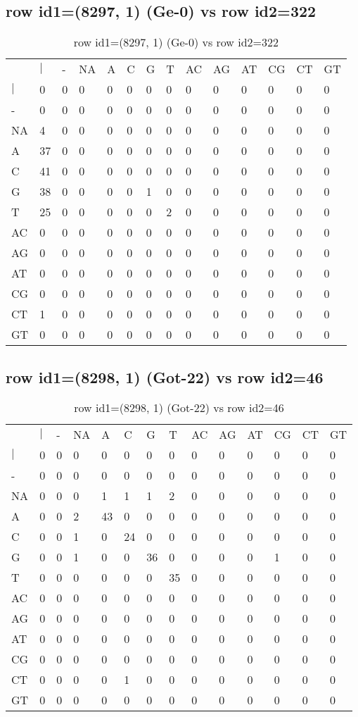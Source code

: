 \subsection{row id1=(8297, 1) (Ge-0) vs row id2=322}
\begin{center}
\begin{longtable}{|l|l|l|l|l|l|l|l|l|l|l|l|l|l|}
\caption{row id1=(8297, 1) (Ge-0) vs row id2=322} \label{table_dm468}\\
\hline
\\
\hline
&$|$&-&NA&A&C&G&T&AC&AG&AT&CG&CT&GT\\
$|$&0&0&0&0&0&0&0&0&0&0&0&0&0\\
-&0&0&0&0&0&0&0&0&0&0&0&0&0\\
NA&4&0&0&0&0&0&0&0&0&0&0&0&0\\
A&37&0&0&0&0&0&0&0&0&0&0&0&0\\
C&41&0&0&0&0&0&0&0&0&0&0&0&0\\
G&38&0&0&0&0&1&0&0&0&0&0&0&0\\
T&25&0&0&0&0&0&2&0&0&0&0&0&0\\
AC&0&0&0&0&0&0&0&0&0&0&0&0&0\\
AG&0&0&0&0&0&0&0&0&0&0&0&0&0\\
AT&0&0&0&0&0&0&0&0&0&0&0&0&0\\
CG&0&0&0&0&0&0&0&0&0&0&0&0&0\\
CT&1&0&0&0&0&0&0&0&0&0&0&0&0\\
GT&0&0&0&0&0&0&0&0&0&0&0&0&0\\
\hline
\end{longtable}
\end{center}

\subsection{row id1=(8298, 1) (Got-22) vs row id2=46}
\begin{center}
\begin{longtable}{|l|l|l|l|l|l|l|l|l|l|l|l|l|l|}
\caption{row id1=(8298, 1) (Got-22) vs row id2=46} \label{table_dm470}\\
\hline
\\
\hline
&$|$&-&NA&A&C&G&T&AC&AG&AT&CG&CT&GT\\
$|$&0&0&0&0&0&0&0&0&0&0&0&0&0\\
-&0&0&0&0&0&0&0&0&0&0&0&0&0\\
NA&0&0&0&1&1&1&2&0&0&0&0&0&0\\
A&0&0&2&43&0&0&0&0&0&0&0&0&0\\
C&0&0&1&0&24&0&0&0&0&0&0&0&0\\
G&0&0&1&0&0&36&0&0&0&0&1&0&0\\
T&0&0&0&0&0&0&35&0&0&0&0&0&0\\
AC&0&0&0&0&0&0&0&0&0&0&0&0&0\\
AG&0&0&0&0&0&0&0&0&0&0&0&0&0\\
AT&0&0&0&0&0&0&0&0&0&0&0&0&0\\
CG&0&0&0&0&0&0&0&0&0&0&0&0&0\\
CT&0&0&0&0&1&0&0&0&0&0&0&0&0\\
GT&0&0&0&0&0&0&0&0&0&0&0&0&0\\
\hline
\end{longtable}
\end{center}

